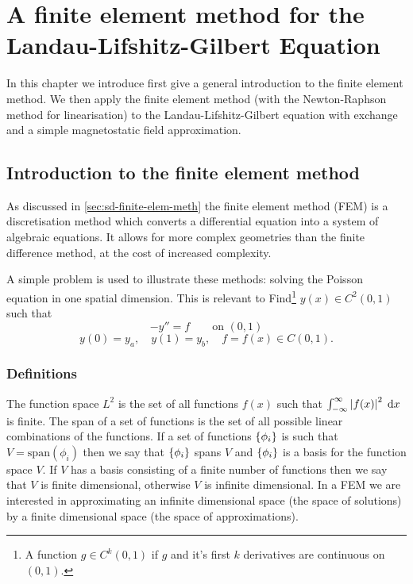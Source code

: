 \chapter{A finite element method for the Landau-Lifshitz-Gilbert Equation}
\label{sec:galerk-meth-llg}

In this chapter we introduce first give a general introduction to the finite element method.
We then apply the finite element method (with the Newton-Raphson method for linearisation) to the Landau-Lifshitz-Gilbert equation with exchange and a simple magnetostatic field approximation.

\section{Introduction to the finite element method}
\label{sec:intr-finite-ele-diff}

As discussed in \cref{sec:sd-finite-elem-meth} the finite element method (FEM) is a discretisation method which converts a differential equation into a system of algebraic equations.
It allows for more complex geometries than the finite difference method, at the cost of increased complexity.

A simple problem is used to illustrate these methods: solving the Poisson
equation in one spatial dimension.
This is relevant to 
Find\footnote{A function $g\in C^{k}(0,1)$ if $g$ and it's first $k$ derivatives are continuous on $(0,1)$.} $y(x)\in C^{2}(0,1)$ such that
\begin{equation}
  -y''=f\qquad\text{on }(0,1)
  \label{eq:poisson1}
\end{equation}
\begin{equation*}
  y(0)=y_{a},\quad y(1)=y_{b},\quad f=f(x)\in C(0,1).
\end{equation*}


\subsection{Definitions}
\label{sec:fem-definitions}

The function space $L^{2}$ is the set of all functions $f(x)$ such that $\int_{-\infty}^{\infty}\left|{f(x)} \right|^{2} {\; \text{d}} x$ is finite.
The span of a set of functions is the set of all possible linear combinations of the functions. 
If a set of functions $\left\{ {\phi_i} \right\}$ is such that $V=\text{span}(\phi_i)$ then we say that $\left\{ {\phi_i} \right\}$ spans $V$ and $\left\{ {\phi_i} \right\}$ is a basis for the function space $V$.
If $V$ has a basis consisting of a finite number of functions then we say that $V$ is finite dimensional, otherwise $V$ is infinite dimensional.
In a FEM we are interested in approximating an infinite dimensional space (the space of solutions) by a finite dimensional space (the space of approximations).

